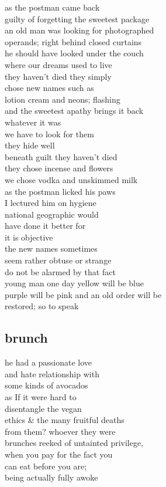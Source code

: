 \documentclass{article}
\begin{document}
as the postman came back\\
guilty of forgetting the sweetest package\\
an old man was looking for photographed\\
operands; right behind closed curtains\\
he should have looked under the couch\\
where our dreams used to live\\
they haven't  died they simply\\
chose new names such as\\
lotion cream and neons; flashing\\
and the sweetest apathy brings it back\\
whatever it was\\

we have to look for them\\
they hide well\\
beneath guilt they haven't died\\
they chose incense and flowers\\
we chose vodka and unskimmed milk\\
as the postman licked his paws\\
I lectured him on hygiene\\
national geographic would\\
have done it better for\\
it is objective\\

the new names sometimes\\
seem rather obtuse or strange\\
do not be alarmed by that fact\\
young man one day yellow will be blue\\
purple will be pink and an old order will be\\
restored; so to speak
\clearpage

\subsection{brunch}

he had a passionate love \\
and hate relationship with\\
some kinds of avocados\\
as If it were hard to\\
disentangle the vegan\\
ethics \& the many fruitful deaths\\
from them? whoever they were\\
brunches reeked of untainted privilege,\\
when you pay for the fact you\\
can eat before you are;\\
being actually fully awoke\\
\end{document}
